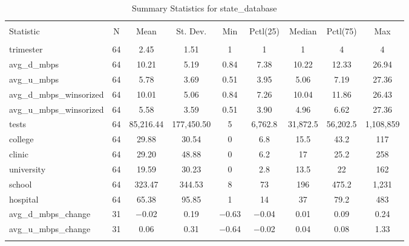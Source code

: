 \documentclass{article}
\begin{document}
\begin{table}[!htbp] \centering 
  \caption{Summary Statistics for state_database} 
  \label{} 
\begin{tabular}{@{\extracolsep{5pt}}lcccccccc} 
\\[-1.8ex]\hline 
\hline \\[-1.8ex] 
Statistic & \multicolumn{1}{c}{N} & \multicolumn{1}{c}{Mean} & \multicolumn{1}{c}{St. Dev.} & \multicolumn{1}{c}{Min} & \multicolumn{1}{c}{Pctl(25)} & \multicolumn{1}{c}{Median} & \multicolumn{1}{c}{Pctl(75)} & \multicolumn{1}{c}{Max} \\ 
\hline \\[-1.8ex] 
trimester & 64 & 2.45 & 1.51 & 1 & 1 & 1 & 4 & 4 \\ 
avg\_d\_mbps & 64 & 10.21 & 5.19 & 0.84 & 7.38 & 10.22 & 12.33 & 26.94 \\ 
avg\_u\_mbps & 64 & 5.78 & 3.69 & 0.51 & 3.95 & 5.06 & 7.19 & 27.36 \\ 
avg\_d\_mbps\_winsorized & 64 & 10.01 & 5.06 & 0.84 & 7.26 & 10.04 & 11.86 & 26.43 \\ 
avg\_u\_mbps\_winsorized & 64 & 5.58 & 3.59 & 0.51 & 3.90 & 4.96 & 6.62 & 27.36 \\ 
tests & 64 & 85,216.44 & 177,450.50 & 5 & 6,762.8 & 31,872.5 & 56,202.5 & 1,108,859 \\ 
college & 64 & 29.88 & 30.54 & 0 & 6.8 & 15.5 & 43.2 & 117 \\ 
clinic & 64 & 29.20 & 48.88 & 0 & 6.2 & 17 & 25.2 & 258 \\ 
university & 64 & 19.59 & 30.23 & 0 & 2.8 & 13.5 & 22 & 162 \\ 
school & 64 & 323.47 & 344.53 & 8 & 73 & 196 & 475.2 & 1,231 \\ 
hospital & 64 & 65.38 & 95.85 & 1 & 14 & 37 & 79.2 & 483 \\ 
avg\_d\_mbps\_change & 31 & $-$0.02 & 0.19 & $-$0.63 & $-$0.04 & 0.01 & 0.09 & 0.24 \\ 
avg\_u\_mbps\_change & 31 & 0.06 & 0.31 & $-$0.64 & $-$0.02 & 0.04 & 0.08 & 1.33 \\ 
\hline \\[-1.8ex] 
\end{tabular} 
\end{table} 
\end{document}
